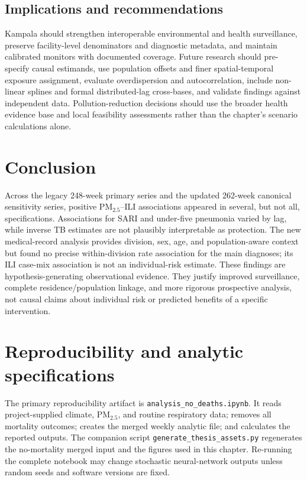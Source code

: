 \documentclass[12pt,a4paper]{report}
\newcommand{\pmfive}{PM$_{2.5}$}
\begin{document}
\section{Implications and recommendations}
Kampala should strengthen interoperable environmental and health surveillance, preserve facility-level denominators and diagnostic metadata, and maintain calibrated monitors with documented coverage. Future research should pre-specify causal estimands, use population offsets and finer spatial-temporal exposure assignment, evaluate overdispersion and autocorrelation, include non-linear splines and formal distributed-lag cross-bases, and validate findings against independent data. Pollution-reduction decisions should use the broader health evidence base and local feasibility assessments rather than the chapter's scenario calculations alone.

\chapter{Conclusion}
Across the legacy 248-week primary series and the updated 262-week canonical sensitivity series, positive \pmfive{}--ILI associations appeared in several, but not all, specifications. Associations for SARI and under-five pneumonia varied by lag, while inverse TB estimates are not plausibly interpretable as protection. The new medical-record analysis provides division, sex, age, and population-aware context but found no precise within-division rate association for the main diagnoses; its ILI case-mix association is not an individual-risk estimate. These findings are hypothesis-generating observational evidence. They justify improved surveillance, complete residence/population linkage, and more rigorous prospective analysis, not causal claims about individual risk or predicted benefits of a specific intervention.

\appendix
\chapter{Reproducibility and analytic specifications}
The primary reproducibility artifact is \texttt{analysis\_no\_deaths.ipynb}. It reads project-supplied climate, \pmfive{}, and routine respiratory data; removes all mortality outcomes; creates the merged weekly analytic file; and calculates the reported outputs. The companion script \texttt{generate\_thesis\_assets.py} regenerates the no-mortality merged input and the figures used in this chapter. Re-running the complete notebook may change stochastic neural-network outputs unless random seeds and software versions are fixed.
\end{document}
